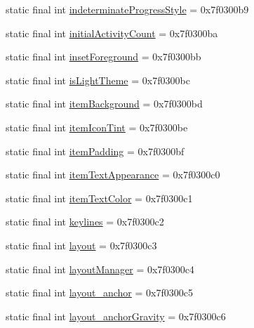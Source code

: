 \begin{DoxyCompactItemize}
\item 
static final int \mbox{\hyperlink{classandroid_1_1support_1_1design_1_1R_1_1attr_acf61552a40e127dc18fd4fb54c1eab8c}{indeterminate\+Progress\+Style}} = 0x7f0300b9
\item 
static final int \mbox{\hyperlink{classandroid_1_1support_1_1design_1_1R_1_1attr_ac1527e93f4ac647fe8b997a212e62754}{initial\+Activity\+Count}} = 0x7f0300ba
\item 
static final int \mbox{\hyperlink{classandroid_1_1support_1_1design_1_1R_1_1attr_a54280b38c1851ec6e215016b464d32c2}{inset\+Foreground}} = 0x7f0300bb
\item 
static final int \mbox{\hyperlink{classandroid_1_1support_1_1design_1_1R_1_1attr_a1f68ce8ebcae8b5f8d8580fbffaabd82}{is\+Light\+Theme}} = 0x7f0300bc
\item 
static final int \mbox{\hyperlink{classandroid_1_1support_1_1design_1_1R_1_1attr_ae48a0f7e4946ee6f29e8bef7569b26c5}{item\+Background}} = 0x7f0300bd
\item 
static final int \mbox{\hyperlink{classandroid_1_1support_1_1design_1_1R_1_1attr_ac3ebcf6eecb614d608d84da08f843033}{item\+Icon\+Tint}} = 0x7f0300be
\item 
static final int \mbox{\hyperlink{classandroid_1_1support_1_1design_1_1R_1_1attr_a55b67df173feee6290403260d8aace52}{item\+Padding}} = 0x7f0300bf
\item 
static final int \mbox{\hyperlink{classandroid_1_1support_1_1design_1_1R_1_1attr_a13c260aff50840e5391823f34b646f84}{item\+Text\+Appearance}} = 0x7f0300c0
\item 
static final int \mbox{\hyperlink{classandroid_1_1support_1_1design_1_1R_1_1attr_a61dc304c9c0451453edf1b7c36f6e2fe}{item\+Text\+Color}} = 0x7f0300c1
\item 
static final int \mbox{\hyperlink{classandroid_1_1support_1_1design_1_1R_1_1attr_ab89509da9ca94f7827610e2ef509f3c4}{keylines}} = 0x7f0300c2
\item 
static final int \mbox{\hyperlink{classandroid_1_1support_1_1design_1_1R_1_1attr_a3aaf263ae2389f59b449db18688458be}{layout}} = 0x7f0300c3
\item 
static final int \mbox{\hyperlink{classandroid_1_1support_1_1design_1_1R_1_1attr_a3ae726ff9deb4f56dd1d6f42ca5cea7d}{layout\+Manager}} = 0x7f0300c4
\item 
static final int \mbox{\hyperlink{classandroid_1_1support_1_1design_1_1R_1_1attr_a3e21ef336487fd263dc6e15b8fe3e6dd}{layout\+\_\+anchor}} = 0x7f0300c5
\item 
static final int \mbox{\hyperlink{classandroid_1_1support_1_1design_1_1R_1_1attr_a03a22adfa172713854cd688456978661}{layout\+\_\+anchor\+Gravity}} = 0x7f0300c6

\end{DoxyCompactItemize}

